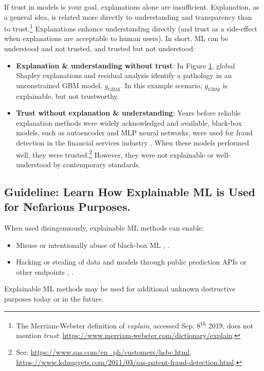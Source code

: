\documentclass[sigconf]{acmart}
\begin{document}
\begin{figure}[htb!]
	\label{fig:global_shap_resid}
\end{figure}

If trust in models is your goal, explanations alone are insufficient. Explanation, as a general idea, is related more directly to understanding and transparency than to trust.\footnote{The Merriam-Webster definition of \textit{explain}, accessed Sep. 8\textsuperscript{th} 2019, does not mention \textit{trust}: \url{https://www.merriam-webster.com/dictionary/explain}.} Explanations enhance understanding directly (and trust as a side-effect when explanations are acceptable to human users). In short, ML can be understood and not trusted, and trusted but not understood:
\begin{itemize}
\item \textbf{Explanation \& understanding without trust}: In Figure \ref{fig:global_shap_resid}, global Shapley explanations and residual analysis identify a pathology in an unconstrained GBM model, $g_{\text{GBM}}$. In this example scenario, $g_{\text{GBM}}$ is explainable, but not trustworthy. 
\item \textbf{Trust without explanation \& understanding}: Years before reliable explanation methods were widely acknowledged and available, black-box models, such as autoencoder and MLP neural networks, were used for fraud detection in the financial services industry \cite{gopinathan1998fraud}. When these models performed well, they were trusted.\footnote{See: \url{https://www.sas.com/en_ph/customers/hsbc.html}, \url{https://www.kdnuggets.com/2011/03/sas-patent-fraud-detection.html}.} However, they were not explainable or well-understood by contemporary standards.  
\end{itemize}

\subsection{Guideline: Learn How Explainable ML is Used for Nefarious Purposes.} \label{sec:nefarious}

When used disingenuously, explainable ML methods can enable:
\begin{itemize}
\item Misuse or intentionally abuse of black-box ML \cite{fair_washing}, \cite{please_stop}.
\item Hacking or stealing of data and models through public prediction APIs or other endpoints \cite{membership_inference}, \cite{model_stealing}. 
\end{itemize}
\noindent Explainable ML methods may be used for additional unknown destructive purposes today or in the future. 
\end{document}
